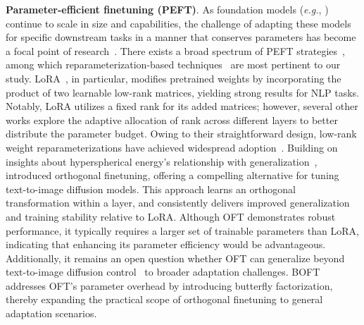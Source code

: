 \textbf{Parameter-efficient finetuning (PEFT)}. As foundation models (\emph{e.g.}, \cite{brown2020language,radford2021learning,rombach2022high,kirillov2023segment}) continue to scale in size and capabilities, the challenge of adapting these models for specific downstream tasks in a manner that conserves parameters has become a focal point of research~\cite{treviso2023efficient,ding2023parameter,lialin2023scaling}. There exists a broad spectrum of PEFT strategies~\cite{houlsby2019parameter,aghajanyan2020intrinsic,hulora2022,edalati2022krona,wang2022adamix,gheini2021cross,zaken2022bitfit,guo2020parameter,sung2021training,ansell2022composable,lester2021power,li2021prefix,vu2022spot,he2021towards,mao2021unipelt,karimi2021compacter,liu2022few,sung2022lst,chen2022parameter,jia2022visual,chen2022adaptformer,zhang2022neural,jie2023fact,lian2022scaling,luo2023towards}, among which reparameterization-based techniques~\cite{aghajanyan2020intrinsic,hulora2022,edalati2022krona} are most pertinent to our study. LoRA~\cite{hulora2022}, in particular, modifies pretrained weights by incorporating the product of two learnable low-rank matrices, yielding strong results for NLP tasks. Notably, LoRA utilizes a fixed rank for its added matrices; however, several other works \cite{zhang2022adaptive,valipour2022dylora,zhang2023increlora} explore the adaptive allocation of rank across different layers to better distribute the parameter budget. Owing to their straightforward design, low-rank weight reparameterizations have achieved widespread adoption~\cite{dettmers2023qlora,zi2023delta,chavan2023one}. Building on insights about hyperspherical energy's relationship with generalization~\cite{liu2018learning,liu2021orthogonal}, \cite{qiu2023controlling} introduced orthogonal finetuning, offering a compelling alternative for tuning text-to-image diffusion models. This approach learns an orthogonal transformation within a layer, and consistently delivers improved generalization and training stability relative to LoRA. Although OFT demonstrates robust performance, it typically requires a larger set of trainable parameters than LoRA, indicating that enhancing its parameter efficiency would be advantageous. Additionally, it remains an open question whether OFT can generalize beyond text-to-image diffusion control~\cite{qiu2023controlling} to broader adaptation challenges. BOFT addresses OFT’s parameter overhead by introducing butterfly factorization, thereby expanding the practical scope of orthogonal finetuning to general adaptation scenarios.

